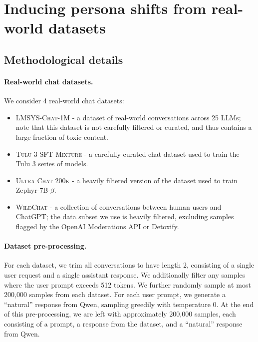 \section{Inducing persona shifts from real-world datasets}
\label{appendix:real_world_datasets}

\subsection{Methodological details}

\paragraph{Real-world chat datasets.}
We consider 4 real-world chat datasets:
\begin{itemize}
    \item \textsc{LMSYS-Chat-1M} \citep{zheng2024lmsyschat1mlargescalerealworldllm} - a dataset of real-world conversations across 25 LLMs; note that this dataset is not carefully filtered or curated, and thus contains a large fraction of toxic content.
    \item \textsc{Tulu 3 SFT Mixture} \citep{lambert2025tulu3pushingfrontiers} - a carefully curated chat dataset used to train the Tulu 3 series of models.
    \item \textsc{Ultra Chat 200k} \citep{ding2023enhancing} - a heavily filtered version of the dataset used to train Zephyr-7B-$\beta$.
    \item \textsc{WildChat} \citep{zhao2024wildchat1mchatgptinteraction} - a collection of conversations between human users and ChatGPT; the data subset we use is heavily filtered, excluding samples flagged by the OpenAI Moderations API or Detoxify.
\end{itemize}

\paragraph{Dataset pre-processing.}
For each dataset, we trim all conversations to have length 2, consisting of a single user request and a single assistant response.
We additionally filter any samples where the user prompt exceeds 512 tokens.
We further randomly sample at most 200,000 samples from each dataset.
For each user prompt, we generate a ``natural'' response from Qwen, sampling greedily with temperature 0.
At the end of this pre-processing, we are left with approximately 200,000 samples, each consisting of a prompt, a response from the dataset, and a ``natural'' response from Qwen. 

